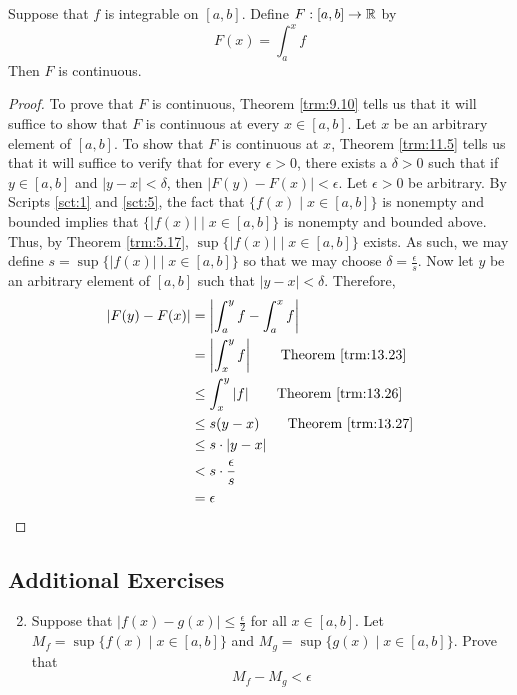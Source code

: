 \documentclass[../main.tex]{subfiles}
\begin{document}
\begin{theorem}\label{trm:13.28}
    Suppose that $f$ is integrable on $[a,b]$. Define $F:[a,b]\to\mathbb{R}$ by
    \begin{equation*}
        F(x) = \int_a^xf
    \end{equation*}
    Then $F$ is continuous.
    \begin{proof}
        To prove that $F$ is continuous, Theorem \ref{trm:9.10} tells us that it will suffice to show that $F$ is continuous at every $x\in[a,b]$. Let $x$ be an arbitrary element of $[a,b]$. To show that $F$ is continuous at $x$, Theorem \ref{trm:11.5} tells us that it will suffice to verify that for every $\epsilon>0$, there exists a $\delta>0$ such that if $y\in[a,b]$ and $|y-x|<\delta$, then $|F(y)-F(x)|<\epsilon$. Let $\epsilon>0$ be arbitrary. By Scripts \ref{sct:1} and \ref{sct:5}, the fact that $\{f(x)\mid x\in[a,b]\}$ is nonempty and bounded implies that $\{|f(x)|\mid x\in[a,b]\}$ is nonempty and bounded above. Thus, by Theorem \ref{trm:5.17}, $\sup\{|f(x)|\mid x\in[a,b]\}$ exists. As such, we may define $s=\sup\{|f(x)|\mid x\in[a,b]\}$ so that we may choose $\delta=\frac{\epsilon}{s}$. Now let $y$ be an arbitrary element of $[a,b]$ such that $|y-x|<\delta$. Therefore,
        \begin{align*}
            |F(y)-F(x)| &= \left| \int_a^yf-\int_a^xf \right|\\
            &= \left| \int_x^yf \right|\tag*{Theorem \ref{trm:13.23}}\\
            &\leq \int_x^y|f|\tag*{Theorem \ref{trm:13.26}}\\
            &\leq s(y-x)\tag*{Theorem \ref{trm:13.27}}\\
            &\leq s\cdot|y-x|\\
            &< s\cdot\frac{\epsilon}{s}\\
            &= \epsilon
        \end{align*}
    \end{proof}
\end{theorem}

\subsection*{Additional Exercises}
\begin{enumerate}[ref={\thechapter.\arabic*}]
    \setcounter{enumi}{1}
    \item \label{axr:13.2}Suppose that $|f(x)-g(x)|\leq\frac{\epsilon}{2}$ for all $x\in[a,b]$. Let $M_f=\sup\{f(x)\mid x\in[a,b]\}$ and $M_g=\sup\{g(x)\mid x\in[a,b]\}$. Prove that
    \begin{equation*}
        M_f-M_g < \epsilon
    \end{equation*}
\end{enumerate}
\end{document}

